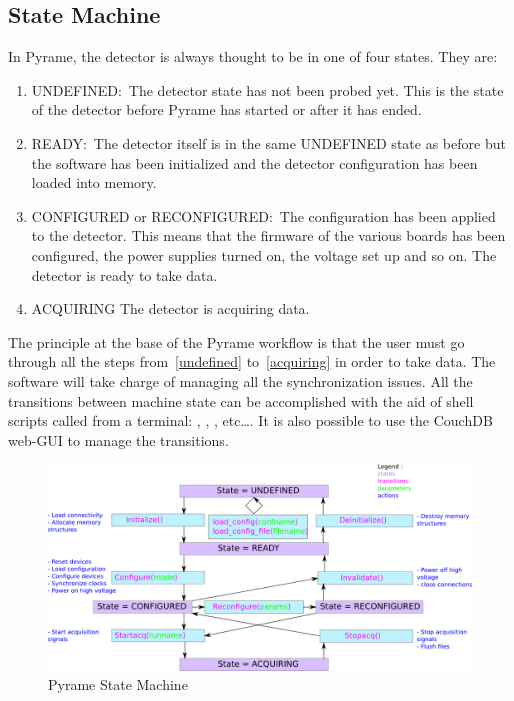 \subsection{State Machine}
In Pyrame, the detector is always thought to be in one of four
states. They are:
\begin{enumerate}
\item\label{undefined} UNDEFINED:\ The detector state has not been
  probed yet. This is the state of the detector before Pyrame has
  started or after it has ended.
\item READY:\ The detector itself is in the same UNDEFINED state as
  before but the software has been initialized and the detector
  configuration has been loaded into memory.
\item CONFIGURED or RECONFIGURED:\ The configuration has been applied
  to the detector. This means that the firmware of the various boards
  has been configured, the power supplies turned on, the voltage set
  up and so on. The detector is ready to take data.
\item\label{acquiring} ACQUIRING The detector is acquiring data.
\end{enumerate}
The principle at the base of the Pyrame workflow is that the user must
go through all the steps from~\ref{undefined} to~\ref{acquiring} in
order to take data. The software will take charge of managing all the
synchronization issues.  All the transitions between machine state can
be accomplished with the aid of shell scripts called from a terminal:
, ,
, etc\dots. It is also possible to use the
CouchDB web-GUI to manage the transitions.
\begin{figure}
  \includegraphics[frame,width=\linewidth]{state_machine.doc.png}
  \caption{Pyrame State Machine}\label{fig:state-machine}
\end{figure}

